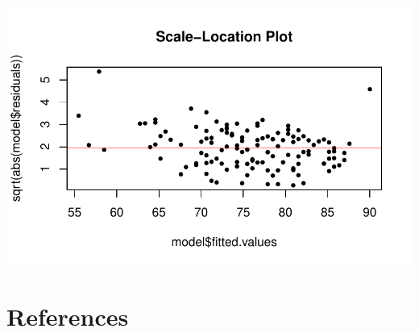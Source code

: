 \documentclass[
  letterpaper,
  DIV=11,
  numbers=noendperiod]{scrartcl}
\begin{document}
\includegraphics{paper_files/figure-pdf/unnamed-chunk-9-3.pdf}

\newpage

\hypertarget{references}{%
\section{References}\label{references}}
\end{document}
